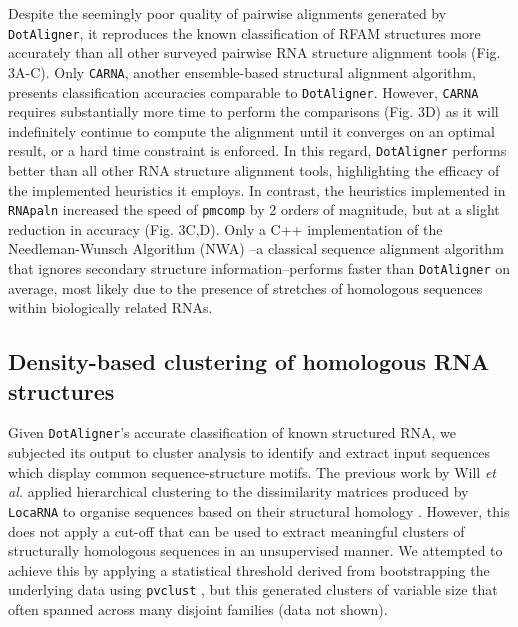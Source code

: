 \documentclass{bmcart}
\newcommand\dotaligner{\texttt{DotAligner}}
\newcommand\locarna{\texttt{LocaRNA}}
\newcommand\carna{\texttt{CARNA}}
\begin{document}
Despite the seemingly poor quality of pairwise alignments generated by \dotaligner{}, it 
reproduces the known classification of RFAM structures more accurately than all 
other surveyed pairwise RNA structure alignment tools (Fig. 3A-C). Only \carna{}, 
another ensemble-based structural alignment algorithm, presents classification accuracies
comparable to \dotaligner{}. However, \carna{} requires substantially more time to perform 
the comparisons (Fig. 3D) as it will indefinitely continue to compute the alignment
until it converges on an optimal result, or a hard time constraint is enforced.  In this regard, \dotaligner{} performs better than all other RNA structure alignment tools, highlighting 
the efficacy of the implemented heuristics it employs. In contrast, the heuristics implemented 
in \texttt{RNApaln} increased the speed of \texttt{pmcomp} by 2 orders of magnitude, but
at a slight reduction in accuracy (Fig. 3C,D). Only a C++ implementation of the 
Needleman-Wunsch Algorithm (NWA) \cite{needleman1970general}--a classical 
sequence alignment algorithm that ignores secondary structure information--performs 
faster than \dotaligner{} on average, most likely due to the presence of stretches of 
homologous sequences within biologically related RNAs. \\

\subsection*{Density-based clustering of homologous RNA structures}

Given \dotaligner{}'s accurate classification of known structured RNA, we subjected its
output to cluster analysis to identify and extract input sequences which display common
sequence-structure motifs. The previous work by Will \textit{et al.} applied hierarchical clustering 
to the dissimilarity matrices produced by \locarna{} to organise sequences based on their
structural homology \cite{Will17432929}. However, this does not apply a cut-off that can be used 
to extract meaningful clusters of structurally homologous sequences in an unsupervised 
manner. We attempted to achieve this by applying a statistical threshold derived from 
bootstrapping the underlying data using \texttt{pvclust} \cite{suzuki2006pvclust}, but this
generated clusters of variable size that often spanned across many disjoint families 
(data not shown).\\
\end{document}
